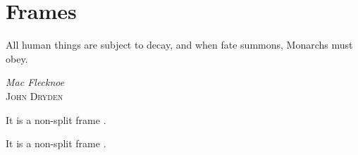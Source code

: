 \chapter{Frames}
\label{ch:ch2}

\epigraph{All human things are subject to decay, and when fate  summons, Monarchs must obey.}{\textit{Mac Flecknoe} \\ \textsc{John Dryden}}

\begin{notice}
	It is a non-split frame .
\end{notice}

\begin{notice}
	\lipsum[6-7]
\end{notice}

\lipsum[8-9]

\begin{highlight}[Problem 1]
	It is a non-split frame .
\end{highlight}

\lipsum[10-11]

\begin{highlight}[Problem 2]
	\lipsum[12-13]
\end{highlight}